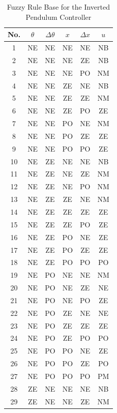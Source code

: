\begin{table}[ht]
	\centering
	\caption{Fuzzy Rule Base for the Inverted Pendulum Controller}
	\label{tab:full_rule_base}
	
	\begin{minipage}{0.48\textwidth}
		\centering
		\begin{tabular}{cccccc}
			\toprule
			No. & $\theta$ & $\Delta\theta$ & $x$ & $\Delta x$ & $u$ \\
			\midrule
			1  & NE & NE & NE & NE & NB \\
			2  & NE & NE & NE & ZE & NB \\
			3  & NE & NE & NE & PO & NM \\
			4  & NE & NE & ZE & NE & NB \\
			5  & NE & NE & ZE & ZE & NM \\
			6  & NE & NE & ZE & PO & ZE \\
			7  & NE & NE & PO & NE & NM \\
			8  & NE & NE & PO & ZE & ZE \\
			9  & NE & NE & PO & PO & ZE \\
			10 & NE & ZE & NE & NE & NB \\
			11 & NE & ZE & NE & ZE & NM \\
			12 & NE & ZE & NE & PO & NM \\
			13 & NE & ZE & ZE & NE & NM \\
			14 & NE & ZE & ZE & ZE & ZE \\
			15 & NE & ZE & ZE & PO & ZE \\
			16 & NE & ZE & PO & NE & ZE \\
			17 & NE & ZE & PO & ZE & ZE \\
			18 & NE & ZE & PO & PO & PO \\
			19 & NE & PO & NE & NE & NM \\
			20 & NE & PO & NE & ZE & NE \\
			21 & NE & PO & NE & PO & ZE \\
			22 & NE & PO & ZE & NE & NE \\
			23 & NE & PO & ZE & ZE & ZE \\
			24 & NE & PO & ZE & PO & PO \\
			25 & NE & PO & PO & NE & ZE \\
			26 & NE & PO & PO & ZE & PO \\
			27 & NE & PO & PO & PO & PM \\
			28 & ZE & NE & NE & NE & NB \\
			29 & ZE & NE & NE & ZE & NM \\

\end{tabular}
\end{minipage}
\end{table}
